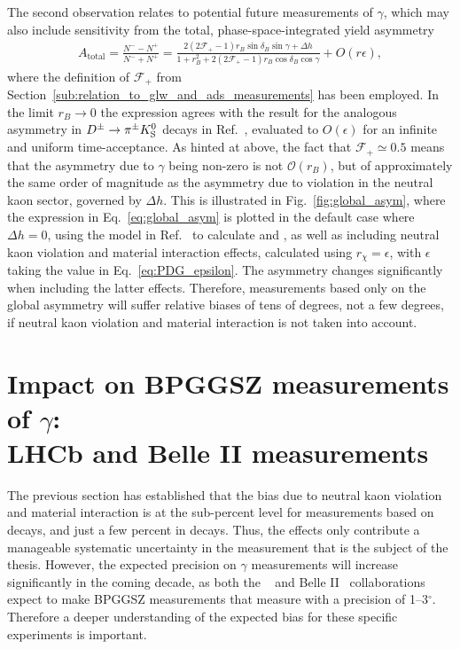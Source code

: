 The second observation relates to potential future measurements of $\gamma$, which may also include sensitivity from the total, phase-space-integrated yield asymmetry
\begin{align}\label{eq:global_asym}
    A_\text{total}=\frac{N^--N^+}{N^-+N^+} = 
    \frac{ 2(2\mathcal F_+ -1)r_B \sin \delta_B \sin \gamma +\Delta h}
    {1 + r_B^2+ 2(2\mathcal F_+ -1) r_B \cos \delta_B \cos \gamma} + O(r\epsilon),
\end{align}
where the definition of $\mathcal F_+$ from Section~\ref{sub:relation_to_glw_and_ads_measurements} has been employed. In the limit $r_B\to 0$ the expression agrees with the result for the analogous asymmetry in ${{D}^\pm}\rightarrow{\ensuremath{{\pi}^\pm}}{\ensuremath{{K}^0_{\mathrm{S}}}}$ decays in Ref.~\cite{grossmanCPViolationKSv2012}, evaluated to $O(\epsilon)$ for an infinite and uniform time-acceptance. As hinted at above, the fact that $\mathcal F_+\simeq 0.5$ means that the asymmetry due to $\gamma$ being non-zero is not $\mathcal O(r_B)$, but of approximately the same order of magnitude as the asymmetry due to \CP violation in the neutral kaon sector, governed by $\Delta h$. This is illustrated in Fig.~\ref{fig:global_asym}, where the expression in Eq.~\eqref{eq:global_asym} is plotted in the default case where $\Delta h=0$, using the model in Ref.~\cite{Belle2018} to calculate \Ki and \ci, as well as including neutral kaon \CP violation and material interaction effects, calculated using $r_\chi=\epsilon$, with $\epsilon$ taking the value in Eq.~\eqref{eq:PDG_epsilon}. The asymmetry changes significantly when including the latter effects. Therefore, measurements based only on the global asymmetry will suffer relative biases of tens of degrees, not a few degrees, if neutral kaon \CP violation and material interaction is not taken into account. 




\section{\texorpdfstring{Impact on BPGGSZ measurements of $\gamma$:\\LHCb and Belle II measurements}{Impact on BPGGSZ measurements of gamma: LHCb and Belle II measurements}} %
\label{sec:impact_on_ggsz_measurements}

The previous section has established that the bias due to neutral kaon \CP violation and material interaction is at the sub-percent level for measurements based on \BtoDK decays, and just a few percent in \BtoDpi decays. Thus, the effects only contribute a manageable systematic uncertainty in the measurement that is the subject of the thesis. However, the expected precision on $\gamma$ measurements will increase significantly in the coming decade, as both the \lhcb~\cite{lhcbcollaborationPhysicsCaseLHCb2019} and Belle II~\cite{kouBelleIIPhysics2019} collaborations expect to make BPGGSZ measurements that measure \g with a precision of 1--3$^\circ$. Therefore a deeper understanding of the expected bias for these specific experiments is important.

